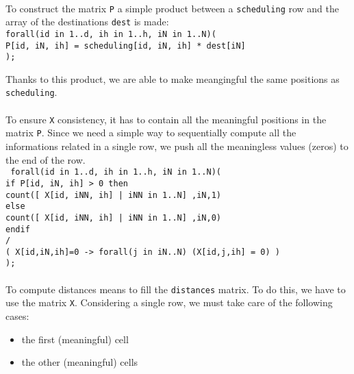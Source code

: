 \documentclass[10pt]{article}
\begin{document}
	\paragraph*{}
	To construct the matrix \texttt{P} a simple product between a \texttt{scheduling} row and the array of the destinations \texttt{dest} is
	made:\\
	\texttt{forall(id in 1..d, ih in 1..h, iN in 1..N)(\\
		P[id, iN, ih] = scheduling[id, iN, ih] * dest[iN]\\
	  );}
	
	Thanks to this product, we are able to make meangingful the same positions
	as \texttt{scheduling}.

	\paragraph*{}
	To ensure \texttt{X} consistency, it has to contain all the meaningful
	positions in the matrix \texttt{P}. Since we need a simple way to sequentially compute all the informations related in a single row, we push all the meaningless values (zeros) to the end of the row. \\ 
	\texttt{
			forall(id in 1..d, ih in 1..h, iN in 1..N)(\\
			if P[id, iN, ih] > 0 then\\ 
			  count([ X[id, iNN, ih] | iNN in 1..N] ,iN,1) \\
			  else \\
			  count([ X[id, iNN, ih] | iNN in 1..N] ,iN,0) \\
			endif\\
			/\ \\
			( X[id,iN,ih]=0 -> forall(j in iN..N) (X[id,j,ih] = 0) )\\
		  );
		  }

	\paragraph*{}
	To compute distances means to fill the \texttt{distances} matrix.
    To do this, we have to use the matrix \texttt{X}. 
	Considering a single row, we must take care of the following cases:
	\begin{itemize}
		\item the first (meaningful) cell
		\item the other (meaningful) cells
	\end{itemize}
	
\end{document}

